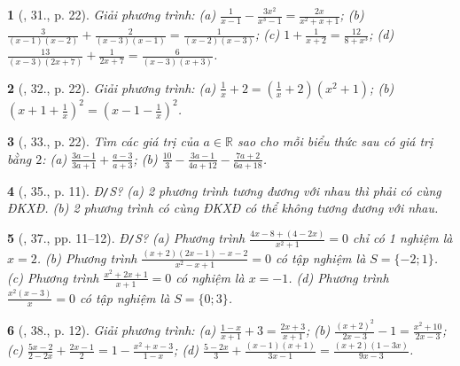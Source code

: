 \documentclass{article}
\newtheorem{baitoan}{}
\begin{document}
\begin{baitoan}[\cite{SGK_Toan_8_tap_2}, 31., p. 22]
	Giải phương trình: (a) $\frac{1}{x - 1} - \frac{3x^2}{x^3 - 1} = \frac{2x}{x^2 + x + 1}$; (b) $\frac{3}{(x - 1)(x - 2)} + \frac{2}{(x - 3)(x - 1)} = \frac{1}{(x - 2)(x - 3)}$; (c) $1 + \frac{1}{x + 2} = \frac{12}{8 + x^3}$; (d) $\frac{13}{(x - 3)(2x + 7)} + \frac{1}{2x + 7} = \frac{6}{(x - 3)(x + 3)}$.
\end{baitoan}

\begin{baitoan}[\cite{SGK_Toan_8_tap_2}, 32., p. 22]
	Giải phương trình: (a) $\frac{1}{x} + 2 = \left(\frac{1}{x} + 2\right)(x^2 + 1)$; (b) $\left(x + 1 + \frac{1}{x}\right)^2 = \left(x - 1 - \frac{1}{x}\right)^2$.
\end{baitoan}

\begin{baitoan}[\cite{SGK_Toan_8_tap_2}, 33., p. 22]
	Tìm các giá trị của $a\in\mathbb{R}$ sao cho mỗi biểu thức sau có giá trị bằng $2$: (a) $\frac{3a - 1}{3a + 1} + \frac{a - 3}{a + 3}$; (b) $\frac{10}{3} - \frac{3a - 1}{4a + 12} - \frac{7a + 2}{6a + 18}$.
\end{baitoan}

\begin{baitoan}[\cite{SBT_Toan_8_tap_2}, 35., p. 11]
	\emph{Đ\texttt{/}S?} (a) 2 phương trình tương đương với nhau thì phải có cùng ĐKXĐ. (b) 2 phương trình có cùng ĐKXĐ có thể không tương đương với nhau.
\end{baitoan}

\begin{baitoan}[\cite{SBT_Toan_8_tap_2}, 37., pp. 11--12]
	\emph{Đ\texttt{/}S?} (a) Phương trình $\frac{4x - 8 + (4 - 2x)}{x^2 + 1} = 0$ chỉ có 1 nghiệm là $x = 2$. (b) Phương trình $\frac{(x + 2)(2x - 1) - x - 2}{x^2 - x + 1} = 0$ có tập nghiệm là $S = \{-2;1\}$. (c) Phương trình $\frac{x^2 + 2x + 1}{x + 1} = 0$ có nghiệm là $x = -1$. (d) Phương trình $\frac{x^2(x - 3)}{x} = 0$ có tập nghiệm là $S = \{0;3\}$.
\end{baitoan}

\begin{baitoan}[\cite{SBT_Toan_8_tap_2}, 38., p. 12]
	Giải phương trình: (a) $\frac{1 - x}{x + 1} + 3 = \frac{2x + 3}{x + 1}$; (b) $\frac{(x + 2)^2}{2x - 3} - 1 = \frac{x^2 + 10}{2x - 3}$; (c) $\frac{5x - 2}{2 - 2x} + \frac{2x - 1}{2} = 1 - \frac{x^2 + x - 3}{1 - x}$; (d) $\frac{5 - 2x}{3} + \frac{(x - 1)(x + 1)}{3x - 1} = \frac{(x + 2)(1 - 3x)}{9x - 3}$.
\end{baitoan}
\end{document}
